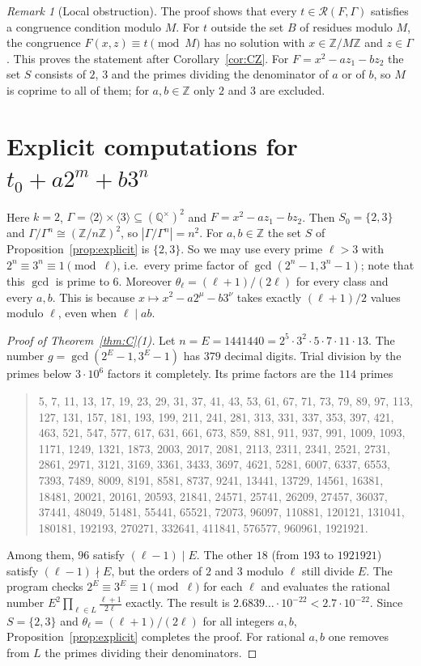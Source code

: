 \documentclass[11pt]{amsart}
\theoremstyle{definition}
\theoremstyle{remark}
\newtheorem{remark}[lemma]{Remark}
\newcommand{\Z}{\mathbb{Z}}
\newcommand{\Q}{\mathbb{Q}}
\newcommand{\R}{\mathcal{R}}
\begin{document}
\begin{remark}[Local obstruction]\label{rem:local}
The proof shows that every $t\in\R(F,\Gamma)$ satisfies a congruence condition modulo $M$.
For $t$ outside the set $B$ of residues modulo $M$, the congruence $F(x,z)\equiv t\pmod M$ has no solution with $x\in\Z/M\Z$ and $z\in\Gamma$.
This proves the statement after Corollary~\ref{cor:CZ}.
For $F=x^2-az_1-bz_2$ the set $S$ consists of $2$, $3$ and the primes dividing the denominator of $a$ or of $b$, so $M$ is coprime to all of them; for $a,b\in\Z$ only $2$ and $3$ are excluded.
\end{remark}

\section{Explicit computations for \texorpdfstring{$t_0+a2^m+b3^n$}{t0+a2m+b3n}}\label{sec:explicit}

Here $k=2$, $\Gamma=\langle2\rangle\times\langle3\rangle\subseteq(\Q^\times)^2$ and $F=x^2-az_1-bz_2$.
Then $S_0=\{2,3\}$ and $\Gamma/\Gamma^n\cong(\Z/n\Z)^2$, so $|\Gamma/\Gamma^n|=n^2$.
For $a,b\in\Z$ the set $S$ of Proposition~\ref{prop:explicit} is $\{2,3\}$.
So we may use every prime $\ell>3$ with $2^n\equiv3^n\equiv1\pmod\ell$, i.e.\ every prime factor of $\gcd(2^n-1,3^n-1)$; note that this $\gcd$ is prime to $6$.
Moreover $\theta_\ell=(\ell+1)/(2\ell)$ for every class and every $a,b$.
This is because $x\mapsto x^2-a2^\mu-b3^\nu$ takes exactly $(\ell+1)/2$ values modulo $\ell$, even when $\ell\mid ab$.

\begin{proof}[Proof of Theorem~\ref{thm:C}(1)]
Let $n=E=1441440=2^5\cdot3^2\cdot5\cdot7\cdot11\cdot13$.
The number $g=\gcd(2^E-1,3^E-1)$ has $379$ decimal digits.
Trial division by the primes below $3\cdot10^6$ factors it completely.
Its prime factors are the $114$ primes
\begin{quote}\small
5, 7, 11, 13, 17, 19, 23, 29, 31, 37, 41, 43, 53, 61, 67, 71, 73, 79, 89, 97, 113, 127, 131, 157, 181, 193, 199, 211, 241, 281, 313, 331, 337, 353, 397, 421, 463, 521, 547, 577, 617, 631, 661, 673, 859, 881, 911, 937, 991, 1009, 1093, 1171, 1249, 1321, 1873, 2003, 2017, 2081, 2113, 2311, 2341, 2521, 2731, 2861, 2971, 3121, 3169, 3361, 3433, 3697, 4621, 5281, 6007, 6337, 6553, 7393, 7489, 8009, 8191, 8581, 8737, 9241, 13441, 13729, 14561, 16381, 18481, 20021, 20161, 20593, 21841, 24571, 25741, 26209, 27457, 36037, 37441, 48049, 51481, 55441, 65521, 72073, 96097, 110881, 120121, 131041, 180181, 192193, 270271, 332641, 411841, 576577, 960961, 1921921.
\end{quote}
Among them, $96$ satisfy $(\ell-1)\mid E$.
The other $18$ (from $193$ to $1921921$) satisfy $(\ell-1)\nmid E$, but the orders of $2$ and $3$ modulo $\ell$ still divide $E$.
The program checks $2^E\equiv3^E\equiv1\pmod\ell$ for each $\ell$ and evaluates the rational number $E^2\prod_{\ell\in L}\frac{\ell+1}{2\ell}$ exactly.
The result is $2.6839\ldots\cdot10^{-22}<2.7\cdot10^{-22}$.
Since $S=\{2,3\}$ and $\theta_\ell=(\ell+1)/(2\ell)$ for all integers $a,b$, Proposition~\ref{prop:explicit} completes the proof.
For rational $a,b$ one removes from $L$ the primes dividing their denominators.
\end{proof}
\end{document}
